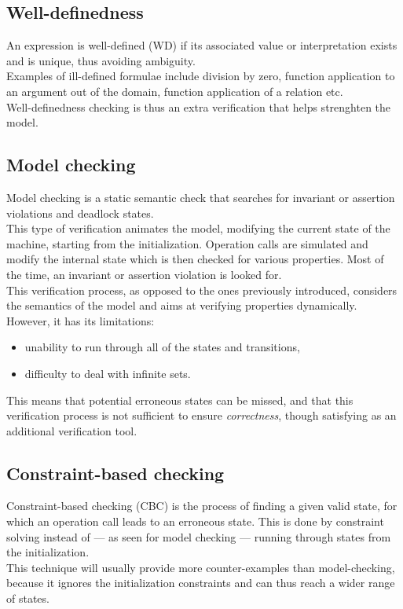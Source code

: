 \documentclass{article}
\begin{document}
\subsection{Well-definedness}
An expression is well-defined (WD) if its associated value or interpretation exists and is unique, thus avoiding ambiguity.\\
Examples of ill-defined formulae include division by zero, function application to an argument out of the domain, function application of a relation etc.\\

Well-definedness checking is thus an extra verification that helps strenghten the model.

\subsection{Model checking}
Model checking is a static semantic check that searches for invariant or assertion violations and deadlock states.\\
This type of verification animates the model, modifying the current state of the machine, starting from the initialization. Operation calls are simulated and modify the internal state which is then checked for various properties. Most of the time, an invariant or assertion violation is looked for.\\

This verification process, as opposed to the ones previously introduced, considers the semantics of the model and aims at verifying properties dynamically. However, it has its limitations:
\begin{itemize}
\item unability to run through all of the states and transitions,
\item difficulty to deal with infinite sets.
\end{itemize}
This means that potential erroneous states can be missed, and that this verification process is not sufficient to ensure {\itshape correctness}, though satisfying as an additional verification tool.

\subsection{Constraint-based checking}

Constraint-based checking (CBC) is the process of finding a given valid state, for which an operation call leads to an erroneous state. This is done by constraint solving instead of --- as seen for model checking --- running through states from the initialization.\\
This technique will usually provide more counter-examples than model-checking, because it ignores the initialization constraints and can thus reach a wider range of states.
\end{document}
